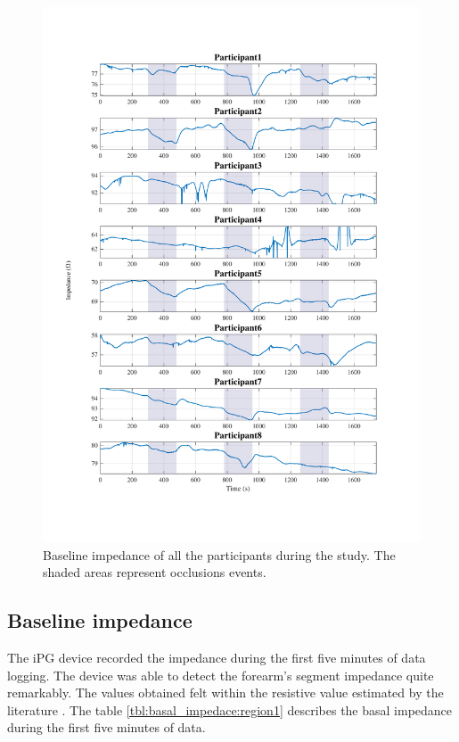 \begin{figure}[htbp]  %
	\includegraphics[width=\textwidth,height=\textheight,keepaspectratio]{figure1}    
	\caption{Baseline impedance of all the participants during the study. The shaded areas represent occlusions events.}
	\label{fig:rb:all_participants}
\end{figure}

\subsection{Baseline impedance}
\label{section5.2.1}
The iPG device recorded the impedance during the first five minutes of data logging. The device was able to detect the forearm's segment impedance quite remarkably. The values obtained felt within the resistive value estimated by the literature . The table \ref{tbl:basal_impedace:region1} describes the basal impedance during the first five minutes of data. 

